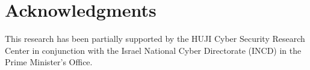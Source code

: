 \documentclass[letterpaper]{article} %
\begin{document}
\section*{Acknowledgments}
This research has been partially supported by the HUJI Cyber Security Research Center in conjunction with the Israel National Cyber Directorate (INCD) in the Prime Minister's Office.


\end{document}
